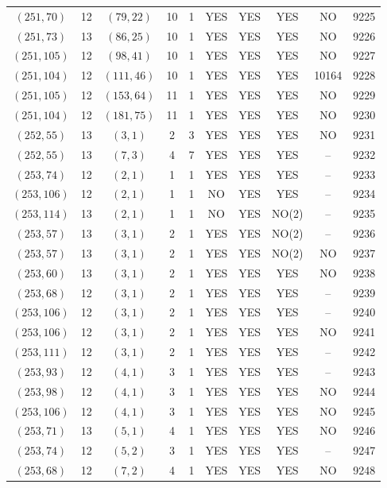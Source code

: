\begin{longtable}{|c|c|c|c|c|c|c|c|c|c|}
$(251, 70)$ & 12 & $(79, 22)$ & 10 & 1 & YES & YES & YES & NO & 9225\\
$(251, 73)$ & 13 & $(86, 25)$ & 10 & 1 & YES & YES & YES & NO & 9226\\
$(251, 105)$ & 12 & $(98, 41)$ & 10 & 1 & YES & YES & YES & NO & 9227\\
$(251, 104)$ & 12 & $(111, 46)$ & 10 & 1 & YES & YES & YES & 10164 & 9228\\
$(251, 105)$ & 12 & $(153, 64)$ & 11 & 1 & YES & YES & YES & NO & 9229\\
$(251, 104)$ & 12 & $(181, 75)$ & 11 & 1 & YES & YES & YES & NO & 9230\\
$(252, 55)$ & 13 & $(3, 1)$ & 2 & 3 & YES & YES & YES & NO & 9231\\
$(252, 55)$ & 13 & $(7, 3)$ & 4 & 7 & YES & YES & YES & -- & 9232\\
$(253, 74)$ & 12 & $(2, 1)$ & 1 & 1 & YES & YES & YES & -- & 9233\\
$(253, 106)$ & 12 & $(2, 1)$ & 1 & 1 & NO & YES & YES & -- & 9234\\
$(253, 114)$ & 13 & $(2, 1)$ & 1 & 1 & NO & YES & NO(2) & -- & 9235\\
$(253, 57)$ & 13 & $(3, 1)$ & 2 & 1 & YES & YES & NO(2) & -- & 9236\\
$(253, 57)$ & 13 & $(3, 1)$ & 2 & 1 & YES & YES & NO(2) & NO & 9237\\
$(253, 60)$ & 13 & $(3, 1)$ & 2 & 1 & YES & YES & YES & NO & 9238\\
$(253, 68)$ & 12 & $(3, 1)$ & 2 & 1 & YES & YES & YES & -- & 9239\\
$(253, 106)$ & 12 & $(3, 1)$ & 2 & 1 & YES & YES & YES & -- & 9240\\
$(253, 106)$ & 12 & $(3, 1)$ & 2 & 1 & YES & YES & YES & NO & 9241\\
$(253, 111)$ & 12 & $(3, 1)$ & 2 & 1 & YES & YES & YES & -- & 9242\\
$(253, 93)$ & 12 & $(4, 1)$ & 3 & 1 & YES & YES & YES & -- & 9243\\
$(253, 98)$ & 12 & $(4, 1)$ & 3 & 1 & YES & YES & YES & NO & 9244\\
$(253, 106)$ & 12 & $(4, 1)$ & 3 & 1 & YES & YES & YES & NO & 9245\\
$(253, 71)$ & 13 & $(5, 1)$ & 4 & 1 & YES & YES & YES & NO & 9246\\
$(253, 74)$ & 12 & $(5, 2)$ & 3 & 1 & YES & YES & YES & -- & 9247\\
$(253, 68)$ & 12 & $(7, 2)$ & 4 & 1 & YES & YES & YES & NO & 9248\\

\end{longtable}
